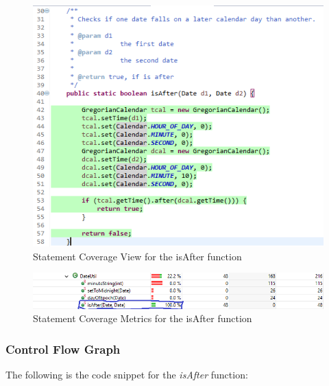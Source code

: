\documentclass[fontsize=12pt,paper=letter,twoside]{scrartcl}
\begin{document}
\begin{figure}[!htb]
\begin{center}
\includegraphics[width=.99\textwidth]{images/wbt/dtt/code.png}
\end{center}
\caption{Statement Coverage View for the isAfter function}
\label{fig:wbt_dtt_code}
\end{figure}

\begin{figure}[!htb]
\begin{center}
\includegraphics[width=.99\textwidth]{images/wbt/dtt/code-coverage.png}
\end{center}
\caption{Statement Coverage Metrics for the isAfter function}
\label{fig:wbt_dtt_code_coverage}
\end{figure}

\newpage
\subsubsection{Control Flow Graph}

The following is the code snippet for the \emph{isAfter} function:
\end{document}
